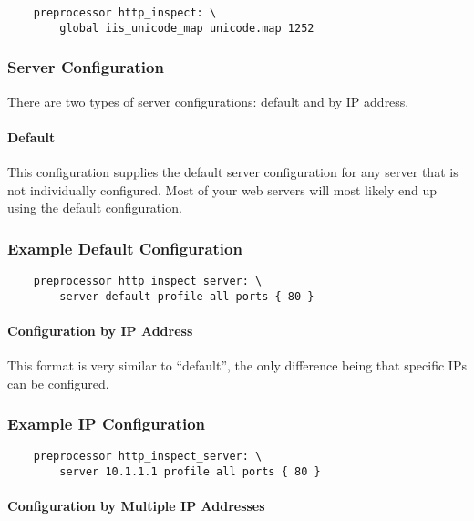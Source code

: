 \documentclass[english]{report}
\begin{document}
\begin{verbatim}
    preprocessor http_inspect: \
        global iis_unicode_map unicode.map 1252
\end{verbatim}

\subsubsection{Server Configuration}

There are two types of server configurations: default and by IP address.

\paragraph{Default}

This configuration supplies the default server configuration for any server
that is not individually configured.  Most of your web servers will most likely
end up using the default configuration.

\subsubsection{Example Default Configuration}

\begin{verbatim}
    preprocessor http_inspect_server: \
        server default profile all ports { 80 }
\end{verbatim}

\paragraph{Configuration by IP Address}

This format is very similar to ``default'', the only difference being that
specific IPs can be configured.

\subsubsection{Example IP Configuration}

\begin{verbatim}
    preprocessor http_inspect_server: \
        server 10.1.1.1 profile all ports { 80 }
\end{verbatim}

\paragraph{Configuration by Multiple IP Addresses}
\end{document}

